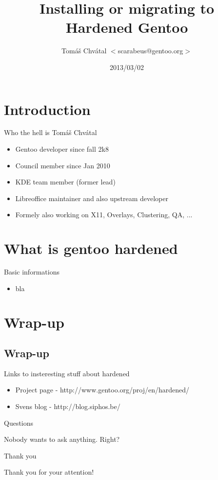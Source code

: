 \documentclass{beamer}
\title{Installing or migrating to Hardened Gentoo}
\author[Tomáš Chvátal]{Tomáš Chvátal $<$scarabeus@gentoo.org$>$}
\date{2013/03/02}
\begin{document}
\frame{\titlepage}
\section{Introduction}
\begin{frame}{Who the hell is Tomáš Chvátal}
	\begin{itemize}
		\item Gentoo developer since fall 2k8
		\item Council member since Jan 2010
		\item KDE team member (former lead)
		\item Libreoffice maintainer and also upstream developer
		\item Formely also working on X11, Overlays, Clustering, QA, ...
	\end{itemize}
\end{frame}
\section{What is gentoo hardened}

\begin{frame}{Basic informations}
	\begin{itemize}
		\item bla
	\end{itemize}
\end{frame}

\section{Wrap-up}

\subsection{Wrap-up}

\begin{frame}{Links to insteresting stuff about hardened}
	\begin{itemize}
		\item Project page - http://www.gentoo.org/proj/en/hardened/
		\item Svens blog - http://blog.siphos.be/
	\end{itemize}
\end{frame}

\begin{frame}{Questions}
	\begin{center}Nobody wants to ask anything. Right?\end{center}
\end{frame}

\begin{frame}{Thank you}
	\begin{center}Thank you for your attention!\end{center}
\end{frame}
\end{document}
